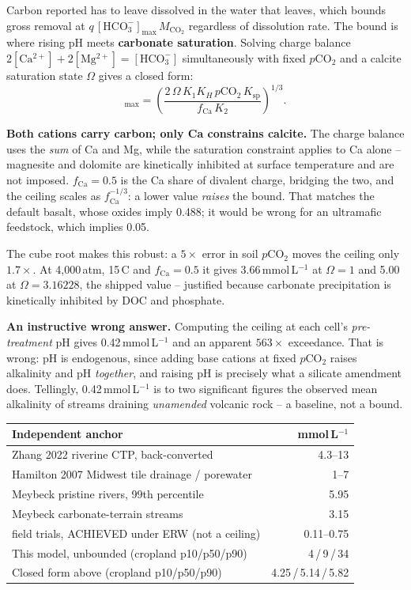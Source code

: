 \documentclass[11pt,a4paper]{article}
\newcommand{\cotwo}{\ensuremath{\mathrm{CO_2}}}
\newcommand{\hco}{\ensuremath{\mathrm{HCO_3^-}}}
\newcommand{\ca}{\ensuremath{\mathrm{Ca^{2+}}}}
\newcommand{\mg}{\ensuremath{\mathrm{Mg^{2+}}}}
\begin{document}
Carbon reported has to leave dissolved in the water that leaves, which bounds
gross removal at $q\,[\hco]_{\max}\,M_{\cotwo}$ regardless of dissolution rate.
The bound is where rising pH meets \textbf{carbonate saturation}. Solving charge
balance $2[\ca] + 2[\mg] = [\hco]$ simultaneously with fixed $p$\cotwo{} and a
calcite saturation state $\Omega$ gives a closed form:
\begin{equation}
[\hco]_{\max} = \left(
  \frac{2\,\Omega\,K_1 K_H\, p\mathrm{CO_2}\, K_{\mathrm{sp}}}
       {f_{\mathrm{Ca}}\,K_2}\right)^{1/3} .
\end{equation}

\textbf{Both cations carry carbon; only Ca constrains calcite.} The charge balance
uses the \emph{sum} of Ca and Mg, while the saturation constraint applies to Ca
alone -- magnesite and dolomite are kinetically inhibited at surface temperature
and are not imposed. $f_{\mathrm{Ca}} = 0.5$ is the Ca share of
divalent charge, bridging the two, and the ceiling scales as
$f_{\mathrm{Ca}}^{-1/3}$: a lower value \emph{raises} the bound. That matches
the default basalt, whose oxides imply
0.488;
it would be wrong for an ultramafic feedstock, which implies 0.05.

The cube root makes this robust: a $5\times$ error in soil $p$\cotwo{} moves the
ceiling only $1.7\times$. At 4,000\,\textmu atm,
15\,\textdegree C and $f_{\mathrm{Ca}} = 0.5$ it gives
3.66\,mmol\,L$^{-1}$ at $\Omega = 1$ and 5.00 at
$\Omega = 3.16228$, the shipped value -- justified because
carbonate precipitation is kinetically inhibited by DOC and phosphate.

\textbf{An instructive wrong answer.} Computing the ceiling at each cell's
\emph{pre-treatment} pH gives 0.42\,mmol\,L$^{-1}$ and an apparent
$563\times$ exceedance. That is wrong: pH is endogenous, since adding base cations
at fixed $p$\cotwo{} raises alkalinity and pH \emph{together}, and raising pH is
precisely what a silicate amendment does. Tellingly, 0.42\,mmol\,L$^{-1}$ is to
two significant figures the observed mean alkalinity of streams draining
\emph{unamended} volcanic rock -- a baseline, not a bound.

\begin{center}\small
\begin{tabular}{lr}
\toprule
Independent anchor & mmol\,L$^{-1}$ \\
\midrule
Zhang 2022 riverine CTP, back-converted & 4.3--13 \\
Hamilton 2007 Midwest tile drainage / porewater & 1--7 \\
Meybeck pristine rivers, 99th percentile & 5.95 \\
Meybeck carbonate-terrain streams & 3.15 \\
field trials, ACHIEVED under ERW (not a ceiling) & 0.11--0.75 \\
\midrule
This model, unbounded (cropland p10/p50/p90) &
4\,/\,9\,/\,34 \\
Closed form above (cropland p10/p50/p90) &
4.25\,/\,5.14\,/\,5.82 \\
\bottomrule
\end{tabular}
\end{center}
\end{document}

